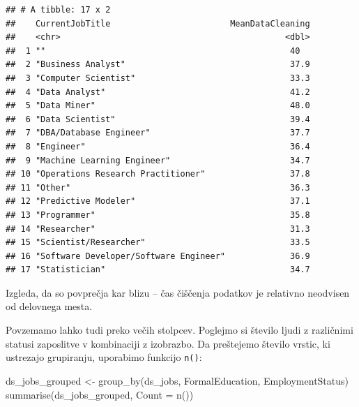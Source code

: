 \documentclass[
]{book}
\newenvironment{Shaded}{\begin{snugshade}}{\end{snugshade}}
\newcommand{\AttributeTok}[1]{\textcolor[rgb]{0.77,0.63,0.00}{#1}}
\newcommand{\FunctionTok}[1]{\textcolor[rgb]{0.00,0.00,0.00}{#1}}
\newcommand{\NormalTok}[1]{#1}
\newcommand{\OtherTok}[1]{\textcolor[rgb]{0.56,0.35,0.01}{#1}}
\begin{document}
\begin{verbatim}
## # A tibble: 17 x 2
##    CurrentJobTitle                        MeanDataCleaning
##    <chr>                                             <dbl>
##  1 ""                                                 40  
##  2 "Business Analyst"                                 37.9
##  3 "Computer Scientist"                               33.3
##  4 "Data Analyst"                                     41.2
##  5 "Data Miner"                                       48.0
##  6 "Data Scientist"                                   39.4
##  7 "DBA/Database Engineer"                            37.7
##  8 "Engineer"                                         36.4
##  9 "Machine Learning Engineer"                        34.7
## 10 "Operations Research Practitioner"                 37.8
## 11 "Other"                                            36.3
## 12 "Predictive Modeler"                               37.1
## 13 "Programmer"                                       35.8
## 14 "Researcher"                                       31.3
## 15 "Scientist/Researcher"                             33.5
## 16 "Software Developer/Software Engineer"             36.9
## 17 "Statistician"                                     34.7
\end{verbatim}

Izgleda, da so povprečja kar blizu -- čas čiščenja podatkov je relativno neodvisen od delovnega mesta.

Povzemamo lahko tudi preko večih stolpcev. Poglejmo si število ljudi z različnimi statusi zaposlitve v kombinaciji z izobrazbo. Da preštejemo število vrstic, ki ustrezajo grupiranju, uporabimo funkcijo \texttt{n()}:

\begin{Shaded}
\begin{Highlighting}[]
\NormalTok{ds\_jobs\_grouped }\OtherTok{\textless{}{-}} \FunctionTok{group\_by}\NormalTok{(ds\_jobs, FormalEducation, EmploymentStatus)}
\FunctionTok{summarise}\NormalTok{(ds\_jobs\_grouped, }\AttributeTok{Count =} \FunctionTok{n}\NormalTok{())}
\end{Highlighting}
\end{Shaded}
\end{document}
